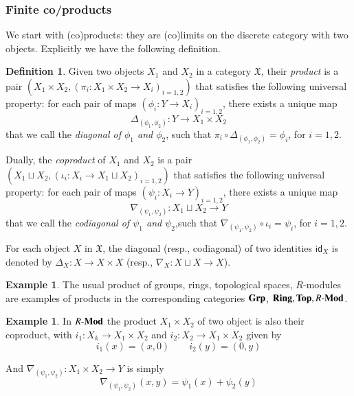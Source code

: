 \documentclass[12pt]{article}
\theoremstyle{definition}
\newtheorem{definition}[lemma]{Definition}
\newtheorem{example}[lemma]{Example}
\def\X{\mathfrak X}
\newcommand{\Grp}{\textbf{\textup{Grp}}}
\newcommand{\Ring}{\textbf{\textup{Ring}}}
\newcommand{\Modu}{R\text{-}\textbf{\textup{Mod}}}
\renewcommand{\Top}{\textbf{\textup{Top}}}
\numberwithin{equation}{section}
\newcommand{\id}[1]{\mathsf{id}_{#1}}
\begin{document}
\subsubsection{Finite co/products}
We start with (co)products:  they are (co)limits on the discrete category with two objects. Explicitly we have the following definition.   
\begin{definition}
Given two objects $X_1$ and $X_2$ in a category $\X$, their {\em product}  is a pair $(X_1\times X_2,(\pi_i\colon X_1\times X_2\to X_i)_{i=1,2})$ that satisfies the following universal property: for each pair of maps $(\phi_i\colon Y\to X_i)_{i=1,2}$, there exists a unique map
\[
\Delta_{(\phi_1,\phi_2)}\colon Y\to X_1\times X_2
\]
that we call the {\em diagonal of $\phi_1$ and $\phi_2$}, such that $\pi_i\circ\Delta_{(\phi_1,\phi_2)}=\phi_i$, for $i=1,2$.

Dually,  the {\em coproduct} of $X_1$ and $X_2$ is a pair $(X_1\sqcup X_2,(\iota_i\colon X_i\to X_1\sqcup X_2)_{i=1,2})$ that satisfies the following universal property: for each pair of maps $(\psi_i\colon  X_i\to Y)_{i=1,2}$, there exists a unique map 
\[
\nabla_{(\psi_1,\psi_2)}\colon  X_1\sqcup  X_2\to Y
\]
that we call the {\em codiagonal of $\psi_1$ and $\psi_2$},such that $\nabla_{(\psi_1,\psi_2)}\circ \iota_i=\psi_i$, for $i=1,2$.

For each object $X$ in $\X$, the diagonal (resp., codiagonal) of two identities $\id X$ is denoted by $\Delta_X\colon X\to X\times X$ (resp., $\nabla_X\colon X\sqcup X\to X$).
\end{definition}

\begin{example}
The usual product of groups, rings, topological spaces, $R$-modules are examples of products in the corresponding categories $\Grp$, $\Ring, \Top, \Modu$.
\end{example}

\begin{example}In $\Modu$ the product $X_1\times X_2$ of two object is also their coproduct, with $i_1:X_k\rightarrow X_1\times X_2$ and $i_2:X_2\rightarrow X_1\times X_2$ given by
	\begin{equation*}
		i_1(x)=(x,0)\qquad i_2(y)=(0,y)
	\end{equation*} 
 \end{example}
And $\nabla_{(\psi_1,\psi_2)}:X_1\times X_2\rightarrow Y$ is simply
\begin{equation*}
\nabla_{(\psi_1,\psi_2)}(x,y)=\psi_1(x)+\psi_2(y)
\end{equation*} 
\end{document}
